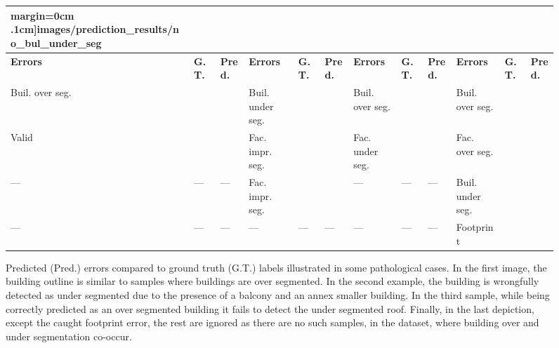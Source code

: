 \documentclass[runningheads]{llncs}
\newcommand{\cmark}{{\color{green} \ding{51}}}%
\newcommand{\xmark}{{\color{red} \ding{55}}}%
\begin{document}
\begin{figure}
\begin{center}
\begin{tabular}{| x{1.11cm} | x{.75cm} | x{.75cm} || x{1.11cm} | x{.75cm} | x{.75cm} || x{1.11cm} | x{.75cm} | x{.75cm} || x{1.11cm} | x{.75cm} | x{.75cm} |}
margin=0cm .1cm]{images/prediction_results/no_bul_under_seg}} \\
			\hline
			\textbf{Errors} & \textbf{G.T.} & \textbf{Pred.} & \textbf{Errors} & \textbf{G.T.} & \textbf{Pred.} & \textbf{Errors} & \textbf{G.T.} & \textbf{Pred.} & \textbf{Errors} & \textbf{G.T.} & \textbf{Pred.}\\
            \hline
            Buil. over seg. & \xmark & \cmark & Buil. under seg. & \xmark & \cmark & Buil. over seg. & \cmark & \cmark & Buil. over seg. & \cmark & \xmark \\
            Valid & \cmark & \xmark & Fac. impr. seg. & \cmark & \xmark & Fac. under seg. & \cmark & \xmark &  Fac. over seg. & \cmark & \xmark \\
            --- & --- & --- & Fac. impr. seg. & \cmark & \xmark & --- & --- & --- & Buil. under seg. & \cmark & \xmark \\
            --- & --- & --- & --- & --- & --- & --- & --- & --- &  Footprint & \cmark & \cmark \\
            \hline
		\end{tabular}
        \caption{\label{fig::results} Predicted (Pred.) errors compared to ground truth (G.T.) labels illustrated in some pathological cases. In the first image, the building outline is similar to samples where buildings are over segmented. In the second example, the building is wrongfully detected as under segmented due to the presence of a balcony and an annex smaller building. In the third sample, while being correctly predicted as an over segmented building it fails to detect the under segmented roof. Finally, in the last depiction, except the caught footprint error, the rest are ignored as there are no such samples, in the dataset, where building over and under segmentation co-occur.}

\end{center}
\end{figure}
\end{document}
